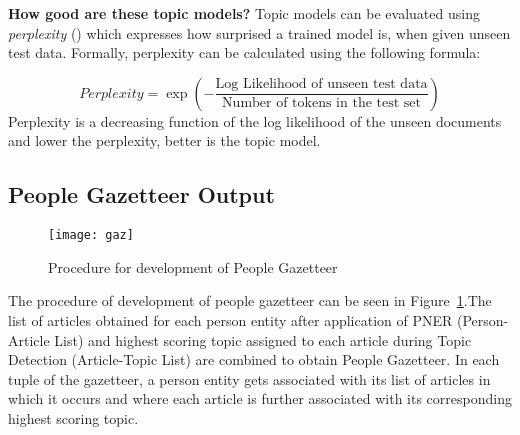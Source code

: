 \noindent \textbf{How good are these topic models?}
Topic models can be evaluated using \emph{perplexity} (\cite{newman2009distributed, blei2003latent}) which expresses how surprised a trained model is, when given unseen test data. %
Formally, perplexity can be calculated using the following formula:

$$Perplexity= \exp(-\dfrac{\text{Log Likelihood of unseen test data}}{\text{Number of tokens in the test set}})$$
Perplexity is a decreasing function of the log likelihood of the unseen documents and lower the perplexity, better is the topic model.


\subsection{People Gazetteer Output }
\label{gaz:result}


\begin{figure}[h]
\centerline{\texttt{[image: gaz]}}
\caption{Procedure for development of People Gazetteer}
\label{figure:gaze}
\end{figure}


The procedure of development of people gazetteer can be seen in Figure~\ref{figure:gaze}.The list of articles obtained for each person entity after application of PNER (Person-Article List) and highest scoring topic assigned to each article during Topic Detection (Article-Topic List) are combined to obtain People Gazetteer. In each tuple of the gazetteer, a person entity gets associated with its list of articles in which it occurs and where each article is further associated with its corresponding highest scoring topic. 

